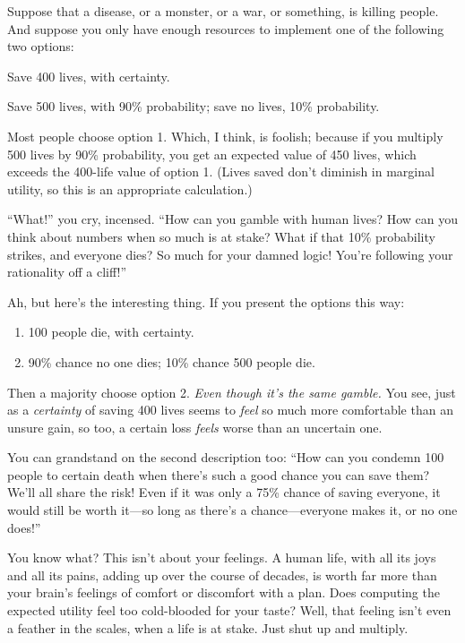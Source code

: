 \myendsectiontext


\bigskip


{
 Suppose that a disease, or a monster, or a war, or something, is
killing people. And suppose you only have enough resources to implement
one of the following two options:}

{
 Save 400 lives, with certainty.}

{
 Save 500 lives, with 90\% probability; save no lives, 10\%
probability.}

{
 Most people choose option 1. Which, I think, is foolish; because
if you multiply 500 lives by 90\% probability, you get an expected
value of 450 lives, which exceeds the 400-life value of option 1.
(Lives saved don't diminish in marginal utility, so
this is an appropriate calculation.)}

{
 ``What!'' you cry, incensed.
``How can you gamble with human lives? How can you
think about numbers when so much is at stake? What if that 10\%
probability strikes, and everyone dies? So much for your damned logic!
You're following your rationality off a
cliff!''}

{
 Ah, but here's the interesting thing. If you
present the options this way:}

\begin{enumerate}
\item {
 100 people die, with certainty.}

\item {
  90\% chance no one dies; 10\% chance 500 people die.}
\end{enumerate}

{
 Then a majority choose option 2. \textit{Even though
it's the same gamble.} You see, just as a
\textit{certainty} of saving 400 lives seems to \textit{feel} so much
more comfortable than an unsure gain, so too, a certain loss
\textit{feels} worse than an uncertain one.}

{
 You can grandstand on the second description too:
``How can you condemn 100 people to certain death when
there's such a good chance you can save them?
We'll all share the risk! Even if it was only a 75\%
chance of saving everyone, it would still be worth it---so long as
there's a chance---everyone makes it, or no one
does!''}

{
 You know what? This isn't about your feelings. A
human life, with all its joys and all its pains, adding up over the
course of decades, is worth far more than your brain's
feelings of comfort or discomfort with a plan. Does computing the
expected utility feel too cold-blooded for your taste? Well, that
feeling isn't even a feather in the scales, when a life
is at stake. Just shut up and multiply.}

